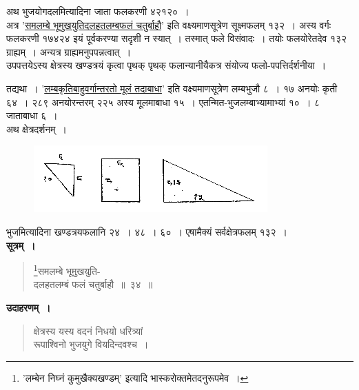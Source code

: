 \documentclass[11pt, openany]{book}
\begin{document}
 अथ भुजयोगदलमित्यादिना जाता फलकरणी ४२१२०~। \\
 
 \vspace{-3mm}
 अत्र '\hyperref[4.34.1]{समलम्बे भूमुखयुतिदलहतलम्बफलं चतुर्बाहौ}' इति वक्ष्यमाणसूत्रेण सूक्ष्मफलम् १३२~। अस्य वर्गः फलकरणी १७४२४
इयं पूर्वकरण्या सदृशी न स्यात्~। तस्मात् फले विसंवादः~। तयोः 
फलयोरेतदेव १३२ ग्राह्यम्~। अन्यत्र ग्राह्यमनुपपन्नत्वात्~। \\

\vspace{-3mm}
 उपपत्तयेऽस्य क्षेत्रस्य खण्डत्रयं कृत्वा पृथक् पृथक् फलान्यानीयैकत्र संयोज्य फलो-पपत्तिर्दर्शनीया~। 
\newpage

 तद्यथा~। '\hyperref[4.38]{लम्बकृतिबाहुवर्गान्तरतो मूलं तदाबाधा}' इति
वक्ष्यमाणसूत्रेण लम्बभुजौ ८~। १७ अनयोः कृती ६४~। २८९ अनयोरन्तरम् २२५ अस्य मूलमाबाधा १५~। एतन्मित-भुजलम्बाभ्यामाभ्यां
१०~। ८ जाताबाधा ६~। \\

\vspace{-3mm}
अथ क्षेत्रदर्शनम्~।
\vspace{-2mm}
\begin{figure}[h!]
    \centering
    \includegraphics[scale=0.8]{graphics/capture41.png}
\end{figure}
 \vspace{-2mm}

 भुजमित्यादिना खण्डत्रयफलानि २४~। ४८~। ६०~। एषामैक्यं सर्वक्षेत्रफलम् १३२~। \\

\vspace{-2mm}
\setcounter{footnote}{0}
 \textbf{सूत्रम्~।} 
 \label{4.34.1}
\begin{quote}
    \bs 
    \footnote{'{\color{violet}लम्बेन निघ्नं कुमुखैक्यखण्डम्}' इत्यादि {\color{violet}भास्करो}क्तमेतदनुरूपमेव~।}समलम्बे भूमुखयुति-\\
    दलहतलम्बं फलं चतुर्बाहौ~॥~३४~॥
\end{quote}
 
 \textbf{उदाहरणम्~।} 
\begin{quote}
    \bqt 
     क्षेत्रस्य यस्य वदनं निधयो धरित्र्यां \\
     रूपाश्विनो भुजयुगे वियदिन्दवश्च~।
\end{quote}
\end{document}

